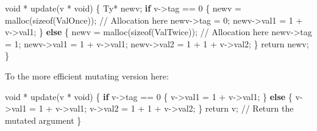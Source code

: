 \documentclass[
]{article}
\newenvironment{Shaded}{}{}
\newcommand{\DataTypeTok}[1]{\textcolor[rgb]{0.56,0.13,0.00}{#1}}
\newcommand{\DecValTok}[1]{\textcolor[rgb]{0.25,0.63,0.44}{#1}}
\newcommand{\FunctionTok}[1]{\textcolor[rgb]{0.02,0.16,0.49}{#1}}
\newcommand{\KeywordTok}[1]{\textcolor[rgb]{0.00,0.44,0.13}{\textbf{#1}}}
\newcommand{\NormalTok}[1]{#1}
\newcommand{\OperatorTok}[1]{\textcolor[rgb]{0.40,0.40,0.40}{#1}}
\newcommand{\OtherTok}[1]{\textcolor[rgb]{0.00,0.44,0.13}{#1}}
\begin{document}
\begin{Shaded}
\begin{Highlighting}[]
\NormalTok{void }\OperatorTok{*}\NormalTok{ update(v }\OperatorTok{*}\NormalTok{ void) \{}
    \DataTypeTok{Ty}\OperatorTok{*}\NormalTok{ newv;}
    \KeywordTok{if}\NormalTok{ v}\OtherTok{{-}\textgreater{}}\NormalTok{tag }\OperatorTok{==} \DecValTok{0}\NormalTok{ \{}
\NormalTok{        newv }\OtherTok{=}\NormalTok{ malloc(sizeof(}\DataTypeTok{ValOnce}\NormalTok{)); }\OperatorTok{//} \DataTypeTok{Allocation}\NormalTok{ here}
\NormalTok{        newv}\OtherTok{{-}\textgreater{}}\NormalTok{tag }\OtherTok{=} \DecValTok{0}\NormalTok{;}
\NormalTok{        newv}\OtherTok{{-}\textgreater{}}\NormalTok{val1 }\OtherTok{=} \DecValTok{1} \OperatorTok{+}\NormalTok{ v}\OtherTok{{-}\textgreater{}}\NormalTok{val1;}
\NormalTok{    \} }\KeywordTok{else}\NormalTok{ \{}
\NormalTok{        newv }\OtherTok{=}\NormalTok{ malloc(sizeof(}\DataTypeTok{ValTwice}\NormalTok{)); }\OperatorTok{//} \DataTypeTok{Allocation}\NormalTok{ here}
\NormalTok{        newv}\OtherTok{{-}\textgreater{}}\NormalTok{tag }\OtherTok{=} \DecValTok{1}\NormalTok{;}
\NormalTok{        newv}\OtherTok{{-}\textgreater{}}\NormalTok{val1 }\OtherTok{=} \DecValTok{1} \OperatorTok{+}\NormalTok{ v}\OtherTok{{-}\textgreater{}}\NormalTok{val1;}
\NormalTok{        newv}\OtherTok{{-}\textgreater{}}\NormalTok{val2 }\OtherTok{=} \DecValTok{1} \OperatorTok{+} \DecValTok{1} \OperatorTok{+}\NormalTok{ v}\OtherTok{{-}\textgreater{}}\NormalTok{val2;}
\NormalTok{    \}}
    \FunctionTok{return}\NormalTok{ newv;}
\NormalTok{\}}
\end{Highlighting}
\end{Shaded}

To the more efficient mutating version here:

\begin{Shaded}
\begin{Highlighting}[]
\NormalTok{void }\OperatorTok{*}\NormalTok{ update(v }\OperatorTok{*}\NormalTok{ void) \{}
    \KeywordTok{if}\NormalTok{ v}\OtherTok{{-}\textgreater{}}\NormalTok{tag }\OperatorTok{==} \DecValTok{0}\NormalTok{ \{}
\NormalTok{        v}\OtherTok{{-}\textgreater{}}\NormalTok{val1 }\OtherTok{=} \DecValTok{1} \OperatorTok{+}\NormalTok{ v}\OtherTok{{-}\textgreater{}}\NormalTok{val1;}
\NormalTok{    \} }\KeywordTok{else}\NormalTok{ \{}
\NormalTok{        v}\OtherTok{{-}\textgreater{}}\NormalTok{val1 }\OtherTok{=} \DecValTok{1} \OperatorTok{+}\NormalTok{ v}\OtherTok{{-}\textgreater{}}\NormalTok{val1;}
\NormalTok{        v}\OtherTok{{-}\textgreater{}}\NormalTok{val2 }\OtherTok{=} \DecValTok{1} \OperatorTok{+} \DecValTok{1} \OperatorTok{+}\NormalTok{ v}\OtherTok{{-}\textgreater{}}\NormalTok{val2;}
\NormalTok{    \}}
    \FunctionTok{return}\NormalTok{ v; }\OperatorTok{//} \DataTypeTok{Return}\NormalTok{ the mutated argument}
\NormalTok{\}}
\end{Highlighting}
\end{Shaded}
\end{document}
